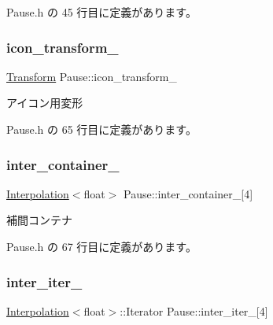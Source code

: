  Pause.\+h の 45 行目に定義があります。

\mbox{\label{class_pause_a8c3cdf04bc62da97b7d3cd3181e0d106}} 
\subsubsection{\texorpdfstring{icon\+\_\+transform\+\_\+}{icon\_transform\_}}
{\footnotesize\ttfamily \mbox{\hyperlink{class_transform}{Transform}} Pause\+::icon\+\_\+transform\+\_\+\hspace{0.3cm}{\ttfamily [private]}}



アイコン用変形 



 Pause.\+h の 65 行目に定義があります。

\mbox{\label{class_pause_a75682108df2d095cc62c0106cc9a913b}} 
\subsubsection{\texorpdfstring{inter\+\_\+container\+\_\+}{inter\_container\_}}
{\footnotesize\ttfamily \mbox{\hyperlink{class_interpolation}{Interpolation}}$<$float$>$ Pause\+::inter\+\_\+container\+\_\+\mbox{[}4\mbox{]}\hspace{0.3cm}{\ttfamily [private]}}



補間コンテナ 



 Pause.\+h の 67 行目に定義があります。

\mbox{\label{class_pause_ad99a99f12949db21eae5cfdaf75b79e6}} 
\subsubsection{\texorpdfstring{inter\+\_\+iter\+\_\+}{inter\_iter\_}}
{\footnotesize\ttfamily \mbox{\hyperlink{class_interpolation}{Interpolation}}$<$float$>$\+::Iterator Pause\+::inter\+\_\+iter\+\_\+\mbox{[}4\mbox{]}\hspace{0.3cm}{\ttfamily [private]}}



